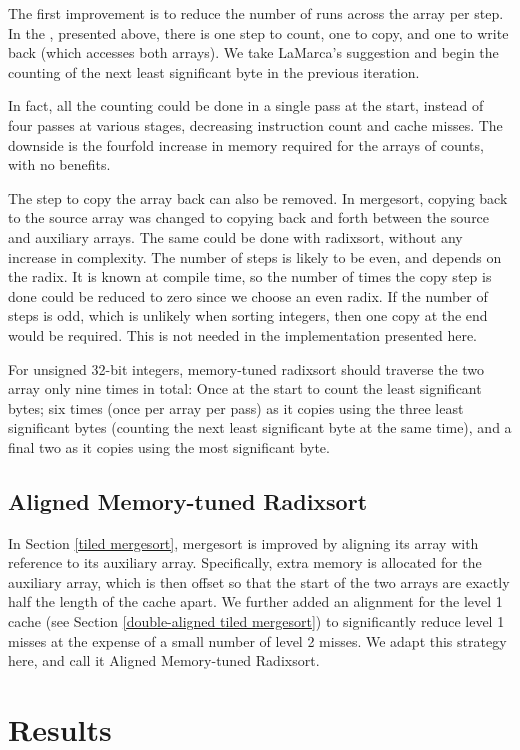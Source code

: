The first improvement is to reduce the number of runs across the array per
step. In the , presented above, there is one step to count,
one to copy, and one to write back (which accesses both arrays). We take
LaMarca's suggestion and begin the counting of the next least significant byte
in the previous iteration.

In fact, all the counting could be done in a single pass at the start, instead
of four passes at various stages, decreasing instruction count and cache misses.
The downside is the fourfold increase in memory required for the arrays of
counts, with no benefits.

The step to copy the array back can also be removed. In mergesort, copying back
to the source array was changed to copying back and forth between the source and
auxiliary arrays. The same could be done with radixsort, without any increase in
complexity. The number of steps is likely to be even, and depends on the radix.
It is known at compile time, so the number of times the copy step is done could
be reduced to zero since we choose an even radix. If the number of steps is odd,
which is unlikely when sorting integers, then one copy at the end would be
required. This is not needed in the implementation presented here.

For unsigned 32-bit integers, memory-tuned radixsort should traverse the two
array only nine times in total: Once at the start to count the least significant
bytes; six times (once per array per pass) as it copies using the three least
significant bytes (counting the next least significant byte at the same time),
and a final two as it copies using the most significant byte.


\subsection{Aligned Memory-tuned Radixsort}
In Section \ref{tiled mergesort}, mergesort is improved by aligning its array
with reference to its auxiliary array. Specifically, extra memory is allocated
for the auxiliary array, which is then offset so that the start of the two
arrays are exactly half the length of the cache apart. We further added an
alignment for the level 1 cache (see Section \ref{double-aligned tiled
mergesort}) to significantly reduce level 1 misses at the expense of a small
number of level 2 misses. We adapt this strategy here, and call it Aligned
Memory-tuned Radixsort.


\section{Results}

